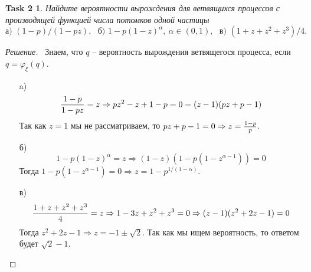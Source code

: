 \documentclass[12pt,a4paper]{extarticle}
\newtheorem*{task2}{Task 2}
\newcommand{\fe}{\varphi}
\begin{document}
	\begin{task2}
		Найдите вероятности вырождения для ветвящихся процессов с производящей функцией числа потомков одной частицы
		\[
			\text{а) } (1 - p)/(1 - pz),~~~ \text{б) } 1 - p(1 - z)^{\alpha} ,~ \alpha \in (0, 1),~~~ \text{в) } (1+z+z^2+z^3)/4.
		\]
	\end{task2}
	\begin{proof} [Решение]
		\
		Знаем, что $q$ -- вероятность вырождения ветвящегося процесса, если $q = \fe_{\xi}(q)$.
		\begin{itemize}
			\item [a)] 
			\[
				{1-p \over 1-pz} = z \Rightarrow pz^2 - z + 1-p = 0 = (z-1)(pz+p-1)
			\]
			Так как $z = 1$ мы не рассматриваем, то $pz + p - 1 = 0 \Rightarrow z = {1-p \over p}$.
			
			\item [б)] 
			\[
				1-p(1-z)^{\alpha} = z 
				\Rightarrow 
				(1-z)(1 - p(1-z^{\alpha - 1})) = 0 
			\]
			Тогда $1 - p(1-z^{\alpha - 1}) = 0 \Rightarrow z = 1-p^{1/(1-\alpha)}$.
			
			\item [в)] 
			\[
				{1+z+z^2+z^3 \over 4} = z 
				\Rightarrow 
				1-3z+z^2+z^3 = 0 \Rightarrow (z-1)(z^2+2z-1) = 0
			\]
			Тогда $z^2+2z-1 \Rightarrow z = -1 \pm \sqrt{2}$. Так как мы ищем вероятность, то ответом будет $\sqrt{2} - 1$.
		\end{itemize}
	\end{proof}
	
	
	
	
	\vspace{\baselineskip}
	
\end{document}
